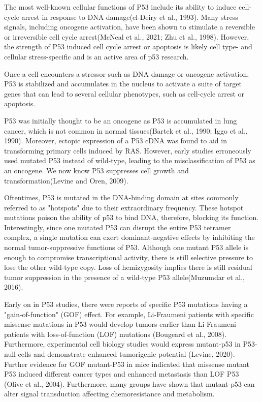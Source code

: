The most well-known cellular functions of P53 include its ability to induce cell-cycle arrest in response to DNA damage(el-Deiry et al., 1993). Many stress signals, including oncogene activation, have been shown to stimulate a reversible or irreversible cell cycle arrest(McNeal et al., 2021; Zhu et al., 1998). However, the strength of P53 induced cell cycle arrest or apoptosis is likely cell type- and cellular stress-specific and is an active area of p53 research.

Once a cell encounters a stressor such as DNA damage or oncogene activation, P53 is stabilized and accumulates in the nucleus to activate a suite of target genes that can lead to several cellular phenotypes, such as cell-cycle arrest or apoptosis.

P53 was initially thought to be an oncogene as P53 is accumulated in lung cancer, which is not common in normal tissues(Bartek et al., 1990; Iggo et al., 1990). Moreover, ectopic expression of a P53 cDNA was found to aid in transforming primary cells induced by RAS. However, early studies erroneously used mutated P53 instead of wild-type, leading to the misclassification of P53 as an oncogene. We now know P53 suppresses cell growth and transformation(Levine and Oren, 2009).

Oftentimes, P53 is mutated in the DNA-binding domain at sites commonly referred to as "hotspots" due to their extraordinary frequency. These hotspot mutations poison the ability of p53 to bind DNA, therefore, blocking its function. Interestingly, since one mutated P53 can disrupt the entire P53 tetramer complex, a single mutation can exert dominant-negative effects by inhibiting the normal tumor-suppressive functions of P53. Although one mutant P53 allele is enough to compromise transcriptional activity, there is still selective pressure to lose the other wild-type copy. Loss of hemizygosity implies there is still residual tumor suppression in the presence of a wild-type P53 allele(Muzumdar et al., 2016).

Early on in P53 studies, there were reports of specific P53 mutations having a "gain-of-function" (GOF) effect. For example, Li-Fraumeni patients with specific missense mutations in P53 would develop tumors earlier than Li-Fraumeni patients with loss-of-function (LOF) mutations (Bougeard et al., 2008). Furthermore, experimental cell biology studies would express mutant-p53 in P53-null cells and demonstrate enhanced tumorigenic potential (Levine, 2020). Further evidence for GOF mutant-P53 in mice indicated that missense mutant P53 induced different cancer types and enhanced metastasis than LOF P53 (Olive et al., 2004). Furthermore, many groups have shown that mutant-p53 can alter signal transduction affecting chemoresistance and metabolism.

